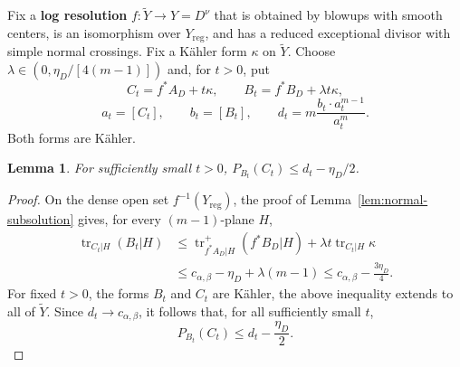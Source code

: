 \documentclass[reqno]{amsart}
\newcommand{\tr}{\operatorname{tr}}
\newcommand{\cab}{c_{\alpha,\beta}}
\newcommand{\reg}{\mathrm{reg}}
\theoremstyle{plain}
\newtheorem{lemma}[thm]{Lemma}
\theoremstyle{remark}
\begin{document}
Fix a \textbf{log resolution} $f:\widetilde Y\to Y=D^\nu$ that is
obtained by blowups with smooth centers, is an isomorphism over
$Y_{\reg}$, and has a reduced exceptional divisor with simple normal
crossings.  Fix a K\"ahler form $\kappa$
on $\widetilde Y$. Choose
$\lambda\in(0,\eta_D/[4(m-1)])$ and, for $t>0$, put
\begin{equation}\label{eq:approx-classes}
 C_t=f^*A_D+t\kappa,\qquad
 B_t=f^*B_D+\lambda t\kappa,
\end{equation}
\[
 a_t=[C_t],\qquad b_t=[B_t],\qquad
 d_t=m\frac{b_t\cdot a_t^{m-1}}{a_t^m}.
\]
Both forms are K\"ahler.
\begin{lemma}\label{lem:strict-cone-condition-blowup}
For sufficiently small $t>0$,
$P_{B_t}(C_t)\leq d_t-\eta_D/2$.
\end{lemma}
\begin{proof}
On the dense open set $f^{-1}(Y_{\reg})$, the proof of
Lemma~\ref{lem:normal-subsolution} gives, for every $(m-1)$-plane $H$,
\[
 \begin{aligned}
 \tr_{C_t|H}(B_t|H)
 &\leq\tr^+_{f^*A_D|H}(f^*B_D|H)
      +\lambda t\tr_{C_t|H}\kappa\\
 &\leq\cab-\eta_D+\lambda(m-1)
 \leq\cab-\frac{3\eta_D}{4}.
 \end{aligned}
\]
For fixed $t>0$, the forms $B_t$ and $C_t$ are K\"ahler, the above inequality extends to all of $\widetilde{Y}$. Since $d_t\to\cab$, it follows
that, for all sufficiently small $t$,
\begin{equation}\label{eq:uniform-subsolution}
 P_{B_t}(C_t)\leq d_t-\frac{\eta_D}{2}.
\end{equation}
\end{proof}
\end{document}
